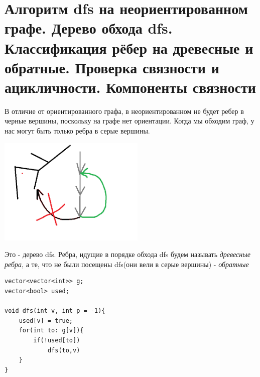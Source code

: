 \setcounter{section}{33}
\section{Алгоритм dfs на неориентированном графе. Дерево обхода dfs. Классификация рёбер на древесные и обратные. Проверка связности и ацикличности. Компоненты связности}
В отличие от ориентированного графа, в неориентированном не будет ребер в черные вершины, поскольку на графе нет ориентации. Когда мы обходим граф, у нас могут быть только  ребра в серые вершины.
\begin{center}
    \includegraphics[width=7cm]{images/34_alg17.PNG}
\end{center}
Это - дерево dfs. Ребра, идущие в порядке обхода dfs будем называть \textit{древесные ребра}, а те, что не были посещены dfs(они вели в серые вершины) - \textit{обратные}
\begin{verbatim}
vector<vector<int>> g;
vector<bool> used;

void dfs(int v, int p = -1){
    used[v] = true;
    for(int to: g[v]){
        if(!used[to]) 
            dfs(to,v)
    }
}
\end{verbatim}

